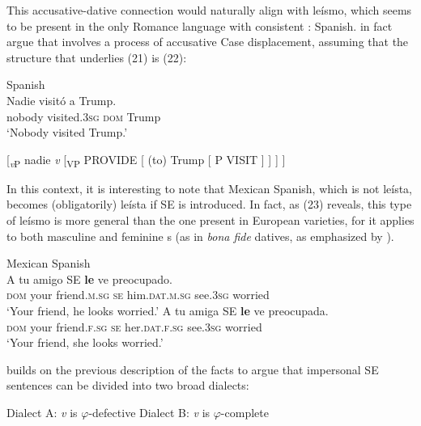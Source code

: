 \documentclass[output=paper]{langsci/langscibook}
\begin{document}
This accusative-dative connection would naturally align with leísmo, which seems to be present in the only Romance language with consistent \DOM: Spanish. \citet{Colomina2017} in fact argue that \DOM involves a process of accusative Case displacement, assuming that the structure that underlies (21) is (22):

\ea%
    Spanish\label{ex:gallego:21}\\
    \gll Nadie    visitó             a          Trump.   \\
         nobody  visited\textsc{{}.3}\textsc{sg}  \textsc{dom}   Trump\\
    \glt ‘Nobody visited Trump.’
    \z

\ea%
    \label{ex:gallego:22}
    [\textit{\textsubscript{v}}\textsubscript{P} nadie \textit{v} [\textsubscript{VP} PROVIDE [ (to) Trump [ P VISIT ] ] ] ]
\z

          

In this context, it is interesting to note that Mexican Spanish, which is not leísta, becomes (obligatorily) leísta if SE is introduced. In fact, as (23) reveals, this type of leísmo is more general than the one present in European varieties, for it applies to both masculine and feminine {\CATDP}s (as in \textit{bona fide} datives, as emphasized by \citealt{Colomina2017}).

\ea%
    Mexican Spanish\label{ex:gallego:23}\\
    \ea
    \gll A       tu      amigo         SE  \textbf{le} ve         preocupado.  \\
         \textsc{dom}   your friend\textsc{{}.m.}\textsc{sg} \textsc{se}   him\textsc{{}.dat.m.}\textsc{sg}  see\textsc{.3sg} worried\\
    \glt ‘Your friend, he looks worried.’
    \ex
    \gll A       tu      amiga        SE  \textbf{le} ve          preocupada. \\
         \textsc{dom}   your friend\textsc{{}.f.}\textsc{sg} \textsc{se}   her\textsc{{}.dat.f.}\textsc{sg} see\textsc{.3sg} worried\\
    \glt ‘Your friend, she looks worried.’
    \z
\z

\citet{Gallego2016} builds on the previous description of the facts to argue that impersonal SE sentences can be divided into two broad dialects:

\ea%
    \label{ex:gallego:24}
    \ea Dialect A: \textit{v} is $\varphi ${}-defective
    \ex Dialect B: \textit{v} is $\varphi ${}-complete
    \z
\z
\end{document}

